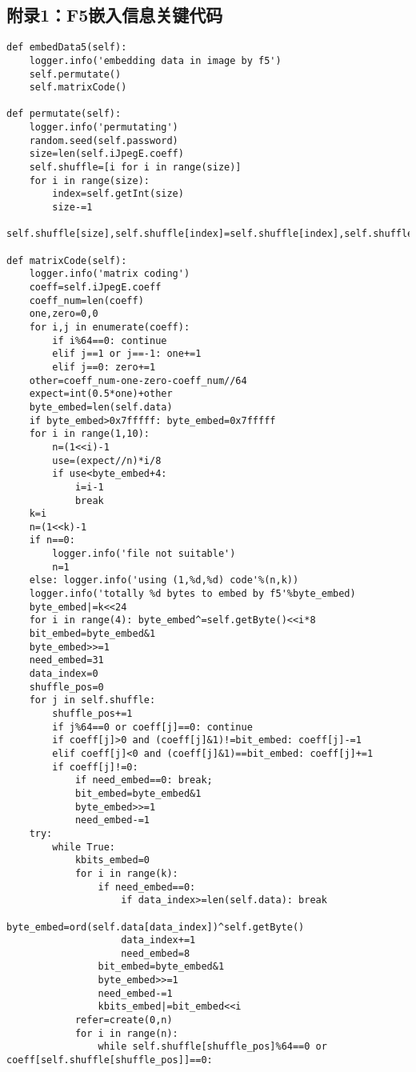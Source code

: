 \documentclass[onecolumn,a4paper,12pt]{article}
\begin{document}
\subsection*{附录1：F5嵌入信息关键代码}
\begin{lstlisting}
def embedData5(self):
    logger.info('embedding data in image by f5')
    self.permutate()
    self.matrixCode()

def permutate(self):
    logger.info('permutating')
    random.seed(self.password)
    size=len(self.iJpegE.coeff)
    self.shuffle=[i for i in range(size)]
    for i in range(size):
        index=self.getInt(size)
        size-=1
        self.shuffle[size],self.shuffle[index]=self.shuffle[index],self.shuffle[size]

def matrixCode(self):
    logger.info('matrix coding')
    coeff=self.iJpegE.coeff
    coeff_num=len(coeff)
    one,zero=0,0
    for i,j in enumerate(coeff):
        if i%64==0: continue
        elif j==1 or j==-1: one+=1
        elif j==0: zero+=1
    other=coeff_num-one-zero-coeff_num//64
    expect=int(0.5*one)+other
    byte_embed=len(self.data)
    if byte_embed>0x7fffff: byte_embed=0x7fffff
    for i in range(1,10):
        n=(1<<i)-1
        use=(expect//n)*i/8
        if use<byte_embed+4:
            i=i-1
            break
    k=i
    n=(1<<k)-1
    if n==0:
        logger.info('file not suitable')
        n=1
    else: logger.info('using (1,%d,%d) code'%(n,k))
    logger.info('totally %d bytes to embed by f5'%byte_embed)
    byte_embed|=k<<24
    for i in range(4): byte_embed^=self.getByte()<<i*8
    bit_embed=byte_embed&1
    byte_embed>>=1
    need_embed=31
    data_index=0
    shuffle_pos=0
    for j in self.shuffle:
        shuffle_pos+=1
        if j%64==0 or coeff[j]==0: continue
        if coeff[j]>0 and (coeff[j]&1)!=bit_embed: coeff[j]-=1
        elif coeff[j]<0 and (coeff[j]&1)==bit_embed: coeff[j]+=1
        if coeff[j]!=0:
            if need_embed==0: break;
            bit_embed=byte_embed&1
            byte_embed>>=1
            need_embed-=1
    try:
        while True:
            kbits_embed=0
            for i in range(k):
                if need_embed==0:
                    if data_index>=len(self.data): break
                    byte_embed=ord(self.data[data_index])^self.getByte()
                    data_index+=1
                    need_embed=8
                bit_embed=byte_embed&1
                byte_embed>>=1
                need_embed-=1
                kbits_embed|=bit_embed<<i
            refer=create(0,n)
            for i in range(n):
                while self.shuffle[shuffle_pos]%64==0 or coeff[self.shuffle[shuffle_pos]]==0:

\end{lstlisting}
\end{document}

